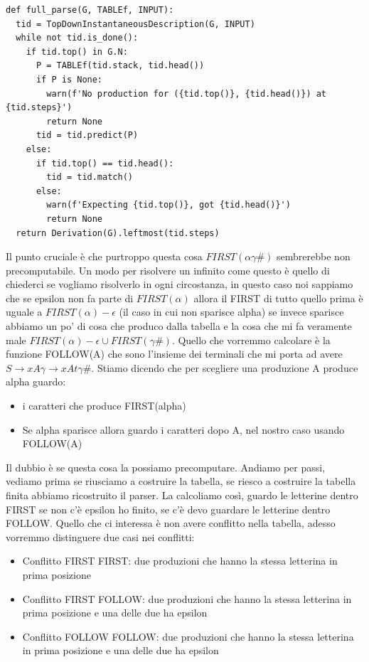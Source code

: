 \begin{lstlisting}
def full_parse(G, TABLEf, INPUT):
  tid = TopDownInstantaneousDescription(G, INPUT)
  while not tid.is_done():
    if tid.top() in G.N:
      P = TABLEf(tid.stack, tid.head())
      if P is None:
        warn(f'No production for ({tid.top()}, {tid.head()}) at {tid.steps}')
        return None
      tid = tid.predict(P)
    else:
      if tid.top() == tid.head():
        tid = tid.match()
      else:
        warn(f'Expecting {tid.top()}, got {tid.head()}')
        return None
  return Derivation(G).leftmost(tid.steps)
\end{lstlisting}

Il punto cruciale è che purtroppo questa cosa $FIRST(\alpha \gamma \#)$ sembrerebbe non precomputabile. Un modo per risolvere un infinito come questo è quello di chiederci se vogliamo risolverlo in ogni circostanza, in questo caso noi sappiamo che se epsilon non fa parte di $FIRST(\alpha)$ allora il FIRST di tutto quello prima è uguale a $FIRST(\alpha) - \epsilon$ (il caso in cui non sparisce alpha) se invece sparisce abbiamo un po' di cosa che produco dalla tabella e la cosa che mi fa veramente male $FIRST(\alpha) - \epsilon \cup FIRST(\gamma \#)$.
Quello che vorremmo calcolare è la funzione FOLLOW(A) che sono l'insieme dei terminali che mi porta ad avere $S \rightarrow x A \gamma \rightarrow x A t \gamma \#$. Stiamo dicendo che per scegliere una produzione A produce alpha guardo:
\begin{itemize}
  \item i caratteri che produce FIRST(alpha)
  \item Se alpha sparisce allora guardo i caratteri dopo A, nel nostro caso usando FOLLOW(A)
\end{itemize}

Il dubbio è se questa cosa la possiamo precomputare. Andiamo per passi, vediamo prima se riusciamo a costruire la tabella, se riesco a costruire la tabella finita abbiamo ricostruito il parser.
La calcoliamo così, guardo le letterine dentro FIRST se non c'è epsilon ho finito, se c'è devo guardare le letterine dentro FOLLOW. Quello che ci interessa è non avere conflitto nella tabella, adesso vorremmo distinguere due casi nei conflitti:
\begin{itemize}
  \item Conflitto FIRST FIRST: due produzioni che hanno la stessa letterina in prima posizione
  \item Conflitto FIRST FOLLOW: due produzioni che hanno la stessa letterina in prima posizione e una delle due ha epsilon
  \item Conflitto FOLLOW FOLLOW: due produzioni che hanno la stessa letterina in prima posizione e una delle due ha epsilon
\end{itemize}

